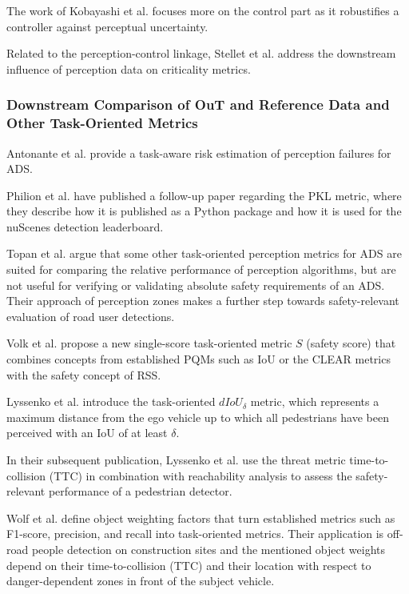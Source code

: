\documentclass[conference]{IEEEtran}
\newcommand{\new}[1]{{\color{my-red}#1}}
\begin{document}
The work of Kobayashi et al. \cite{Kobayashi2021} focuses more on the control part as it robustifies a controller against perceptual uncertainty.


Related to the perception-control linkage, Stellet et al. \cite{Stellet2015propagation} address the downstream influence of perception data on criticality metrics.



\subsubsection{Downstream Comparison of \new{OuT} and Reference Data \new{and Other Task-Oriented Metrics}}
\label{sec:downstream_comparison}

Antonante et al. \cite{Antonante2023task_aware} provide a task-aware risk estimation of perception failures for ADS.

Philion et al. \cite{Philion2020implementingPKL} have published a follow-up paper regarding the PKL metric, where they describe how it is published as a Python package and how it is used for the nuScenes detection leaderboard.

Topan et al. \cite{Topan2022zones} argue that some other task-oriented perception metrics for ADS are suited for comparing the relative performance of perception algorithms, but are not useful for verifying or validating absolute safety requirements of an ADS. Their approach of perception zones makes a further step towards safety-relevant evaluation of road user detections.

Volk et al. \cite{Volk2020metric} propose a new single-score task-oriented metric $S$ (safety score) that combines concepts from established PQMs such as IoU or the CLEAR metrics with the safety concept of RSS. 

Lyssenko et al. \cite{Lyssenko2021relevance} introduce the task-oriented $dIoU_\delta$ metric, which represents a maximum distance from the ego vehicle up to which all pedestrians have been perceived with an IoU of at least $\delta$. 

In their subsequent publication, Lyssenko et al. \cite{Lyssenko2022safety} use the threat metric time-to-collision (TTC) in combination with reachability analysis to assess the safety-relevant performance of a pedestrian detector. 

Wolf et al. \cite{Wolf2021people} define object weighting factors that turn established metrics such as F1-score, precision, and recall into task-oriented metrics. 
Their application is off-road people detection on construction sites and the mentioned object weights depend on their time-to-collision (TTC) and their location with respect to danger-dependent zones in front of the subject vehicle. 
\end{document}

